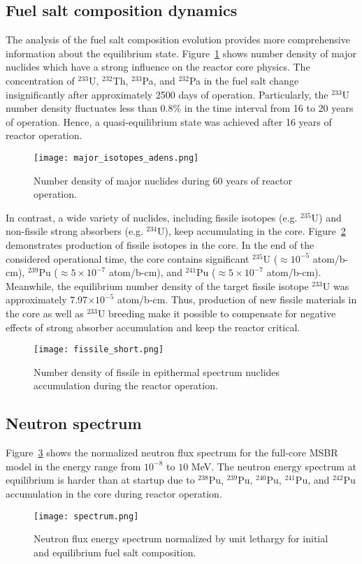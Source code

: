 \subsection{Fuel salt composition dynamics}
The analysis of the fuel salt composition evolution provides more comprehensive 
information about the equilibrium state. Figure~\ref{fig:adens_eq} shows number 
density of major nuclides which have a strong influence on the reactor core 
physics. The concentration of $^{233}$U, $^{232}$Th, $^{233}$Pa, and $^{232}$Pa in 
the fuel salt change insignificantly after approximately 2500 days of operation. 
Particularly, the $^{233}$U number density fluctuates less than 0.8\% in the time 
interval from 16 to 20 years of operation. Hence, a quasi-equilibrium state was 
achieved after 16 years of reactor operation.
\begin{figure}[ht!] %
  \centering
  \texttt{[image: major\_isotopes\_adens.png]}
  \caption{Number density of major nuclides during 60 years of reactor 
  operation.}
  \label{fig:adens_eq}
\end{figure}
In contrast, a wide variety of nuclides, including fissile isotopes (e.g. 
$^{235}$U) and non-fissile strong absorbers (e.g. $^{234}$U), keep accumulating 
in the core. Figure~\ref{fig:fissile_short} demonstrates production of fissile 
isotopes in the core. In the end of the considered operational time, the core 
contains significant $^{235}$U ($\approx10^{-5}$ atom/b-cm), $^{239}$Pu 
($\approx5\times10^{-7}$ atom/b-cm), and $^{241}$Pu ($\approx 5\times10^{-7}$ 
atom/b-cm). Meanwhile, the equilibrium number density of the target fissile 
isotope $^{233}$U was approximately 7.97$\times10^{-5}$ atom/b-cm. Thus, 
production of new fissile materials in the core as well as $^{233}$U breeding 
make it possible to compensate for negative effects of strong absorber 
accumulation and keep the reactor critical.
\begin{figure}[htp!] %
  \centering
  \texttt{[image: fissile\_short.png]}
  \caption{Number density of fissile in epithermal spectrum nuclides 
  accumulation during the reactor operation.}
  \label{fig:fissile_short}
\end{figure}

\subsection{Neutron spectrum}
Figure~\ref{fig:spectrum} shows the normalized neutron flux spectrum for the 
full-core \gls{MSBR} model in the energy range from $10^{-8}$ to $10$ MeV. The 
neutron energy spectrum at equilibrium is harder than at startup due to 
$^{238}$Pu, $^{239}$Pu, $^{240}$Pu, $^{241}$Pu, and $^{242}$Pu accumulation in 
the core during reactor operation.  
\begin{figure}[ht!] %
  \centering
  \texttt{[image: spectrum.png]} \caption{Neutron flux energy 
  spectrum normalized by unit lethargy for initial and equilibrium fuel salt 
  composition.}
  \label{fig:spectrum}
\end{figure}

